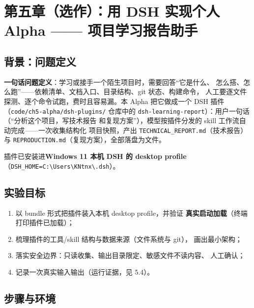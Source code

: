 \clearpage
\section{第五章（选作）：用 DSH 实现个人 Alpha —— 项目学习报告助手}

\subsection{背景：问题定义}

\textbf{一句话问题定义}：学习或接手一个陌生项目时，需要回答``它是什么、
怎么搭、怎么跑''——依赖清单、文档入口、目录结构、git 状态、构建命令，
人工要逐文件探测、逐个命令试跑，费时且容易漏。本 Alpha 把它做成一个
DSH 插件（\nolinkurl{code/ch5-alpha/dsh-plugins/} 仓库中的
\texttt{dsh-learning-report}）：用户一句话（``分析这个项目，写技术报告
和复现方案''），模型按插件分发的 skill 工作流自动完成——一次收集结构化
项目快照，产出 \texttt{TECHNICAL\_REPORT.md}（技术报告）与
\texttt{REPRODUCTION.md}（复现方案），全部落盘为文件。

插件已安装进\textbf{Windows 11 本机 DSH 的 desktop profile}
（\texttt{DSH\_HOME=C:\textbackslash Users\textbackslash KNtnx\textbackslash .dsh}）。

\subsection{实验目标}

\begin{enumerate}[leftmargin=4em,itemsep=0pt,topsep=2pt]
    \item 以 bundle 形式把插件装入本机 desktop profile，并验证
          \textbf{真实启动加载}（终端打印插件已加载）；
    \item 梳理插件的工具/skill 结构与数据来源（文件系统与 git），
          画出最小架构；
    \item 落实安全边界：只读收集、输出目录限定、敏感文件不读内容、
          人工确认；
    \item 记录一次真实输入输出（运行证据，见 5.4）。
\end{enumerate}

\subsection{步骤与环境}

